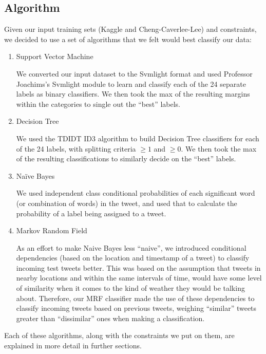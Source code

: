 \subsection{Algorithm}
	Given our input training sets (Kaggle and Cheng-Caverlee-Lee) and constraints, we decided to use a set of algorithms that we felt would best classify our data:

\begin{enumerate}
\item Support Vector Machine

We converted our input dataset to the Svmlight format and used Professor Joachims’s Svmlight module to learn and classify each of the 24 separate labels as binary classifiers. We then took the max of the resulting margins within the categories to single out the “best” labels.

\item Decision Tree

We used the TDIDT ID3 algorithm to build Decision Tree classifiers for each of the 24 labels, with splitting criteria $\ge 1$ and $\ge 0$. We then took the max of the resulting classifications to similarly decide on the “best” labels.

\item Naïve Bayes

We used independent class conditional probabilities of each significant word (or combination of words) in the tweet, and used that to calculate the probability of a label being assigned to a tweet.

\item Markov Random Field

	As an effort to make Naive Bayes less ``naive'', we introduced conditional dependencies (based on the location and timestamp of a tweet) to classify incoming test tweets better. This was based on the assumption that tweets in nearby locations and within the same intervals of time, would have some level of similarity when it comes to the kind of weather they would be talking about. Therefore, our MRF classifier made the use of these dependencies to classify incoming tweets based on previous tweets, weighing ``similar'' tweets greater than ``dissimilar'' ones when making a classification.
\end{enumerate}

	Each of these algorithms, along with the constraints we put on them, are explained in more detail in further sections.

